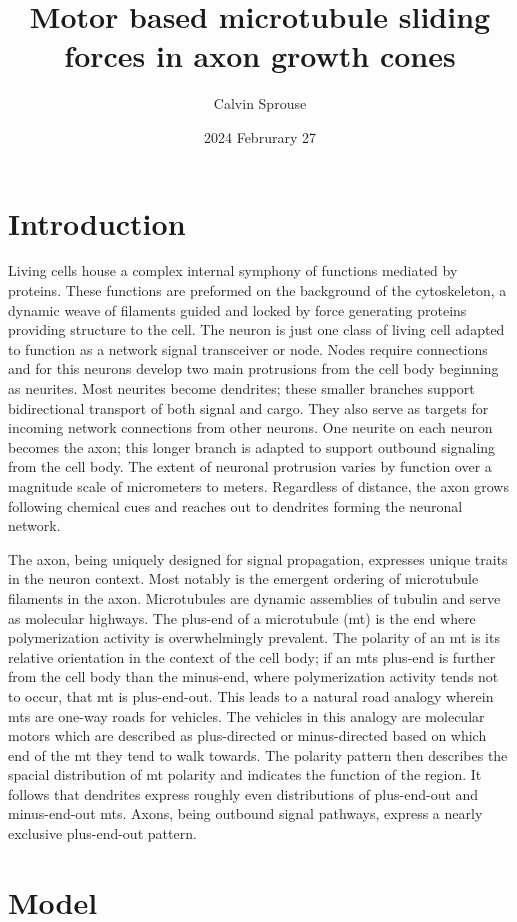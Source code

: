 \documentclass[a4paper, 12pt]{article}
\title{Motor based microtubule sliding forces in axon growth cones}
\author{Calvin Sprouse}
\affil{PHYS 322, Winter 2024}
\date{2024 Februrary 27}
\begin{document}
\maketitle

\section*{Introduction}
Living cells house a complex internal symphony of functions mediated by proteins. These functions are preformed on the background of the cytoskeleton, a dynamic weave of filaments guided and locked by force generating proteins providing structure to the cell. The neuron is just one class of living cell adapted to function as a network signal transceiver or node. Nodes require connections and for this neurons develop two main protrusions from the cell body beginning as neurites. Most neurites become dendrites; these smaller branches support bidirectional transport of both signal and cargo. They also serve as targets for incoming network connections from other neurons. One neurite on each neuron becomes the axon; this longer branch is adapted to support outbound signaling from the cell body. The extent of neuronal protrusion varies by function over a magnitude scale of micrometers to meters. Regardless of distance, the axon grows following chemical cues and reaches out to dendrites forming the neuronal network.

The axon, being uniquely designed for signal propagation, expresses uni\-que traits in the neuron context. Most notably is the emergent ordering of microtubule filaments in the axon. Microtubules are dynamic assemblies of tubulin and serve as molecular highways. The plus-end of a microtubule (mt) is the end where polymerization activity is overwhelmingly prevalent. The polarity of an mt is its relative orientation in the context of the cell body; if an mts plus-end is further from the cell body than the minus-end, where polymerization activity tends not to occur, that mt is plus-end-out. This leads to a natural road analogy wherein mts are one-way roads for vehicles. The vehicles in this analogy are molecular motors which are described as plus-directed or minus-directed based on which end of the mt they tend to walk towards. The polarity pattern then describes the spacial distribution of mt polarity and indicates the function of the region. It follows that dendrites express roughly even distributions of plus-end-out and minus-end-out mts. Axons, being outbound signal pathways, express a nearly exclusive plus-end-out pattern.



\section*{Model}




\end{document}

